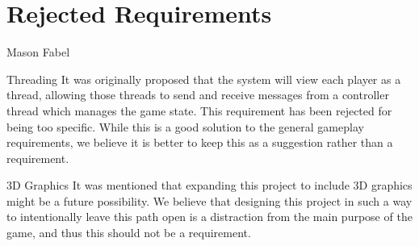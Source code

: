 \documentclass[12pt]{report}
\begin{document}
\chapter{Rejected Requirements}

\begin{section}{Mason Fabel}
\begin{subsection}{Threading}
It was originally proposed that the system will view each player as a
thread, allowing those threads to send and receive messages from a
controller thread which manages the game state. This requirement has been
rejected for being too specific. While this is a good solution to the
general gameplay requirements, we believe it is better to keep this as a
suggestion rather than a requirement.
\end{subsection}

\begin{subsection}{3D Graphics}
It was mentioned that expanding this project to include 3D graphics might
be a future possibility. We believe that designing this project in such a
way to intentionally leave this path open is a distraction from the main
purpose of the game, and thus this should not be a requirement.
\end{subsection}
\end{section}
\end{document}
